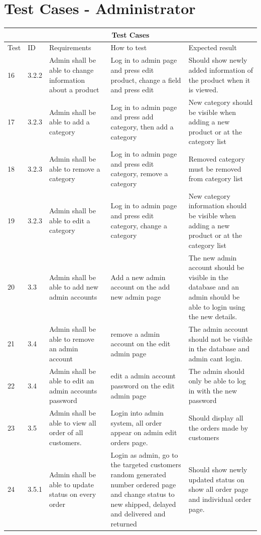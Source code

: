 \documentclass[a4paper,12pt]{article}
\begin{document}
	\newpage
	\section{Test Cases - Administrator}
	
		\begin{tabular}{ |p{0.8cm}|p{0.8cm}|p{3.8cm}|p{3.8cm}|p{3.8cm}|  }
			\hline
			\multicolumn{5}{|c|}{Test Cases} \\
			\hline
			Test& ID & Requirements &How to test&Expected result\\
			\hline
			
			 16 & 3.2.2 &Admin shall be able to change information about a product & Log in to admin page and press edit product, change a field and press edit & Should show newly added information of the product when it is viewed. \\
			\hline
			 17 &3.2.3 & Admin shall be able to add a category & Log in to admin page and press add category, then add a category & New category should be visible when adding a new product or at the category list \\
			\hline
			18 & 3.2.3 &Admin shall be able to remove a category & Log in to admin page and press edit category, remove a category & Removed category must be removed from category list \\
			\hline
			19 &3.2.3 &Admin shall be able to edit a category & Log in to admin page and press edit category, change a category & New category information should be visible when adding a new product or at the category list \\
			\hline
			 20 & 3.3 &Admin shall be able to add new admin accounts & Add a new admin account on the add new admin page & The new admin account should be visible in the database and an admin should be able to login using the new details.\\
			\hline
			 21& 3.4 &Admin shall be able to remove an admin account & remove a admin account on the edit admin page & The admin account should not be visible in the database and admin cant login. \\
			\hline
			 22& 3.4 &Admin shall be able to edit an admin accounts password & edit a admin account password on the edit admin page & The admin should only be able to log in with the new password \\
			 \hline
			 23 &3.5 &Admin shall be able to view all order of all customers. & Login into admin system, all order appear on admin edit orders page. & Should display all the orders made by customers \\
			\hline
			
			24 & 3.5.1 & Admin shall be able to update status on every order & Login as admin, go to the targeted customers random generated number ordered page and change status to new shipped, delayed and delivered and returned & Should show newly updated status on show all order page and individual order page. \\ 
			\hline
			
			
		\end{tabular}
		
			
		

	
\end{document}
